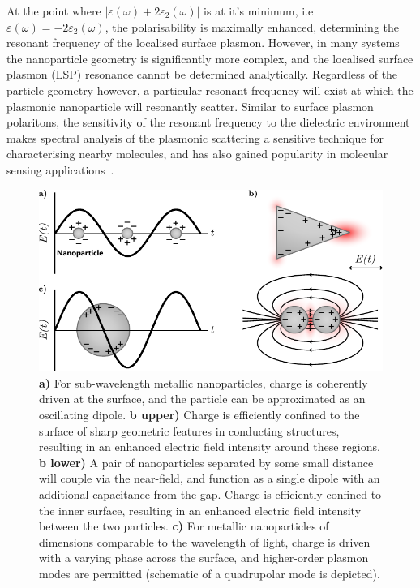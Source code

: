 At the point where $\lvert \varepsilon (\omega) + 2\varepsilon_2 (\omega) \rvert$ is at it's minimum, i.e $\varepsilon (\omega) = -2\varepsilon_2 (\omega)$, the polarisability is maximally enhanced, determining the resonant frequency of the localised surface plasmon. However, in many systems the nanoparticle geometry is significantly more complex, and the localised surface plasmon (LSP) resonance cannot be determined analytically. Regardless of the particle geometry however, a particular resonant frequency will exist at which the plasmonic nanoparticle will resonantly scatter. Similar to surface plasmon polaritons, the sensitivity of the resonant frequency to the dielectric environment makes spectral analysis of the plasmonic scattering a sensitive technique for characterising nearby molecules, and has also gained popularity in molecular sensing applications~\cite{Petryayeva2011a, Polavarapu2014, Cheng2015}.


\begin{figure}[htb!]
    \centering
    \includegraphics[scale=1.0]{./figures/background/plasmonics/lsp.pdf}
    \caption{\label{fig:background:Plasmonics:LSP} \textbf{a)} For sub-wavelength metallic nanoparticles, charge is coherently driven at the surface, and the particle can be approximated as an oscillating dipole. \textbf{b upper)} Charge is efficiently confined to the surface of sharp geometric features in conducting structures, resulting in an enhanced electric field intensity around these regions.  \textbf{b lower)} A pair of nanoparticles separated by some small distance will couple via the near-field, and function as a single dipole with an additional capacitance from the gap. Charge is efficiently confined to the inner surface, resulting in an enhanced electric field intensity between the two particles. \textbf{c)} For metallic nanoparticles of dimensions comparable to the wavelength of light, charge is driven with a varying phase across the surface, and higher-order plasmon modes are permitted (schematic of a quadrupolar mode is depicted).}
\end{figure}


